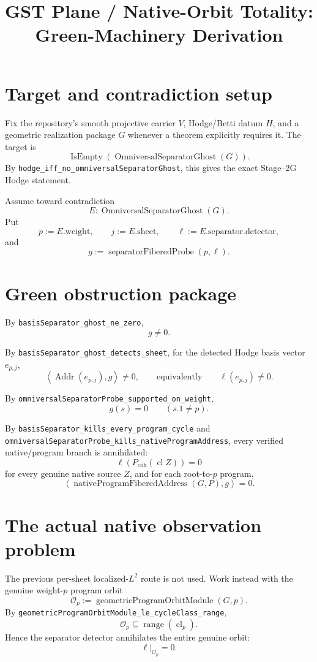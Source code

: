 \documentclass[11pt]{article}
\title{GST Plane / Native-Orbit Totality: Green-Machinery Derivation}
\date{}
\newcommand{\pair}[2]{\left\langle #1,#2\right\rangle}
\begin{document}
\maketitle

\section{Target and contradiction setup}

Fix the repository's smooth projective carrier $V$, Hodge/Betti datum $H$, and
a geometric realization package $G$ whenever a theorem explicitly requires it.
The target is
\[
  \operatorname{IsEmpty}(\operatorname{OmniversalSeparatorGhost}(G)).
\]
By \texttt{hodge\_iff\_no\_omniversalSeparatorGhost}, this gives the exact
Stage--2G Hodge statement.

Assume toward contradiction
\[
 E:\operatorname{OmniversalSeparatorGhost}(G).
\]
Put
\[
 p:=E.\mathrm{weight},\qquad j:=E.\mathrm{sheet},
 \qquad \ell:=E.\mathrm{separator.detector},
\]
and
\[
 g:=\operatorname{separatorFiberedProbe}(p,\ell).
\]

\section{Green obstruction package}

By \texttt{basisSeparator\_ghost\_ne\_zero},
\[
 g\neq0. \tag{G1}
\]

By \texttt{basisSeparator\_ghost\_detects\_sheet},
for the detected Hodge basis vector $e_{p,j}$,
\[
 \pair{\operatorname{Addr}(e_{p,j})}{g}\neq0,
 \qquad\text{equivalently}\qquad \ell(e_{p,j})\neq0. \tag{G2}
\]

By \texttt{omniversalSeparatorProbe\_supported\_on\_weight},
\[
 g(s)=0\qquad(s.1\neq p). \tag{G3}
\]

By \texttt{basisSeparator\_kills\_every\_program\_cycle} and
\texttt{omniversalSeparatorProbe\_kills\_nativeProgramAddress}, every
verified native/program branch is annihilated:
\[
 \ell\!\left(P_{\mathrm{coh}}(\operatorname{cl}Z)\right)=0
\]
for every genuine native source $Z$, and for each root-to-$p$ program,
\[
 \pair{\operatorname{nativeProgramFiberedAddress}(G,P)}{g}=0. \tag{G4}
\]

\section{The actual native observation problem}

The previous per-sheet localized-$L^2$ route is not used. Work instead with
the genuine weight-$p$ program orbit
\[
  \mathcal O_p:=\operatorname{geometricProgramOrbitModule}(G,p).
\]
By \texttt{geometricProgramOrbitModule\_le\_cycleClass\_range},
\[
  \mathcal O_p\subseteq \operatorname{range}(\operatorname{cl}_p).
  \tag{6}
\]
Hence the separator detector annihilates the entire genuine orbit:
\[
  \ell|_{\mathcal O_p}=0. \tag{7}
\]
\end{document}
